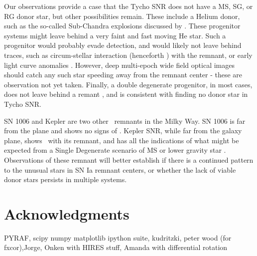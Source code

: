 Our observations provide a case that the Tycho SNR does not have a MS, SG, or RG donor star, but other possibilities remain. These include a Helium donor, such as the so-called Sub-Chandra explosions discussed by \cite{1995ApJ...452...62L, 2010ApJ...714L..52S}. These progenitor systems might leave behind a very faint and fast moving He star. Such a progenitor would probably evade detection, and would likely not leave behind traces, such as circum-stellar interaction (henceforth \csi) with the remnant, or early light curve anomalies \citep{2010ApJ...708.1025K}. However, deep multi-epoch wide field optical images should catch any such star speeding away from the remnant center - these are observation not yet taken.
 Finally, a double degenerate progenitor, in most cases, does not leave behind a remant , and is consistent with finding no donor star in Tycho SNR. 
 
SN 1006 and Kepler are two other \snia\ remnants in the Milky Way. SN 1006 is far from the plane and shows no signs of \csi. Kepler SNR, while far from the galaxy plane, shows \csi\ with its remnant, and has all the indications of what might be expected from a Single Degenerate scenario of MS or lower gravity star \citep{2011arXiv1103.5487C}. Observations of these remnant will better establish if there is a continued pattern to the unusual stars in SN Ia remnant centers, or whether the lack of viable donor stars persists in multiple systems. 
 
\section{Acknowledgments}
\label{sec:acknowledgments}
PYRAF, scipy numpy matplotlib ipython suite, kudritzki, peter wood (for fxcor),Jorge, Onken with HIRES stuff, Amanda with differential rotation


